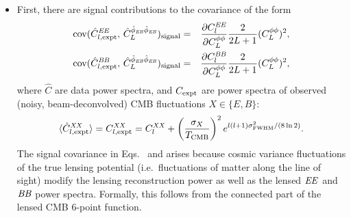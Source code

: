 \begin{itemize}
\item First, there are signal contributions to the covariance of the form
\begin{eqnarray}
  \label{eq:covEEphiEBphiEB}
  \mathrm{cov}(\hat C^{\mathit{EE}}_{l,\mathrm{expt}},\, 
  \hat{C}^{\hat\phi_{\mathit{EB}}\hat\phi_{\mathit{EB}}}_{L})_\mathrm{signal}
&=&
\frac{\partial C^{\mathit{EE}}_l}{\partial C^{\phi\phi}_{L}}
\frac{2}{2L+1} (C^{\phi\phi}_{L})^2,\\
  \label{eq:covBBphiEBphiEB}
  \mathrm{cov}(\hat C^{\mathit{BB}}_{l,\mathrm{expt}},\, 
  \hat{C}^{\hat\phi_{\mathit{EB}}\hat\phi_{\mathit{EB}}}_{L})_\mathrm{signal}
&=&
\frac{\partial C^{\mathit{BB}}_l}{\partial C^{\phi\phi}_{L}}
\frac{2}{2L+1} (C^{\phi\phi}_{L})^2,
\end{eqnarray}
where $\hat C$ are data power spectra, and $C_{\mathrm{expt}}$ are power spectra of observed (noisy, beam-deconvolved) CMB fluctuations $X\in \{E,B\}$:
\begin{equation}
  \label{eq:CXXexptExpectation}
  \langle\hat C^{\mathit{XX}}_{l,\mathrm{expt}}\rangle = 
 C^{\mathit{XX}}_{l,\mathrm{expt}} = C^{\mathit{XX}}_{l}
+ \left(\frac{\sigma_X}{T_\mathrm{CMB}}\right)^2 
  e^{l(l+1)\sigma^2_{\mathrm{FWHM}}/(8\ln 2)}.
\end{equation}
The signal covariance in Eqs.~ and  arises because cosmic variance fluctuations of the true lensing potential (i.e.~fluctuations of matter along the line of sight) modify the lensing reconstruction power as well as the lensed $\mathit{EE}$ and $\mathit{BB}$ power spectra.  Formally, this follows from the connected part of the lensed CMB 6-point function.


\end{itemize}
